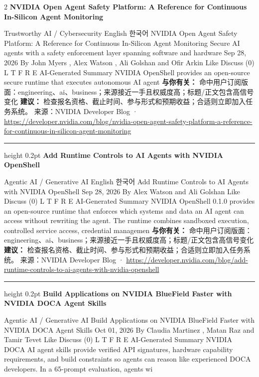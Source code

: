 \documentclass[10.5pt]{ctexart}
\begin{document}
\begin{multicols}{2}
{\large\bfseries NVIDIA Open Agent Safety Platform: A Reference for Continuous In-Silicon Agent Monitoring}\par
Trustworthy AI / Cybersecurity English 한국어 NVIDIA Open Agent Safety Platform: A Reference for Continuous In-Silicon Agent Monitoring Secure AI agents with a safety enforcement layer spanning software and hardware Sep 28, 2026 By John Myers , Alex Watson , Ali Golshan and Ofir Arkin Like Discuss (0) L T F R E AI-Generated Summary NVIDIA OpenShell provides an open-source secure runtime that executes autonomous AI agent
\textbf{与你有关：} 命中用户订阅版面：engineering、ai、business；来源接近一手且权威度高；标题/正文包含高信号变化
\textbf{建议：} 检查报名资格、截止时间、参与形式和预期收益；合适则立即加入任务系统。
{\footnotesize\color{ormuted} 来源：NVIDIA Developer Blog · \url{https://developer.nvidia.com/blog/nvidia-open-agent-safety-platform-a-reference-for-continuous-in-silicon-agent-monitoring}}
\vspace{2mm}
\hrule height 0.2pt
\vspace{2mm}
{\large\bfseries Add Runtime Controls to AI Agents with NVIDIA OpenShell}\par
Agentic AI / Generative AI English 한국어 Add Runtime Controls to AI Agents with NVIDIA OpenShell Sep 28, 2026 By Alex Watson and Ali Golshan Like Discuss (0) L T F R E AI-Generated Summary NVIDIA OpenShell 0.1.0 provides an open-source runtime that enforces which systems and data an AI agent can access without rewriting the agent. The runtime combines sandboxed execution, controlled service access, credential managemen
\textbf{与你有关：} 命中用户订阅版面：engineering、ai、business；来源接近一手且权威度高；标题/正文包含高信号变化
\textbf{建议：} 检查报名资格、截止时间、参与形式和预期收益；合适则立即加入任务系统。
{\footnotesize\color{ormuted} 来源：NVIDIA Developer Blog · \url{https://developer.nvidia.com/blog/add-runtime-controls-to-ai-agents-with-nvidia-openshell}}
\vspace{2mm}
\hrule height 0.2pt
\vspace{2mm}
{\large\bfseries Build Applications on NVIDIA BlueField Faster with NVIDIA DOCA Agent Skills}\par
Agentic AI / Generative AI Build Applications on NVIDIA BlueField Faster with NVIDIA DOCA Agent Skills Oct 01, 2026 By Claudia Martinez , Matan Raz and Tamir Tevet Like Discuss (0) L T F R E AI-Generated Summary NVIDIA DOCA AI agent skills provide verified API signatures, hardware capability requirements, and build constraints so agents can reason like experienced DOCA developers. In a 65-prompt evaluation, agents wi

\end{multicols}
\end{document}
